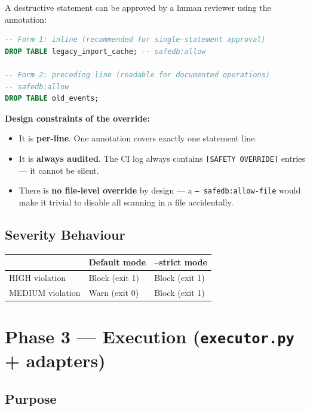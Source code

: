 \documentclass[12pt,a4paper]{report}
\begin{document}
A destructive statement can be approved by a human reviewer using the annotation:

\begin{lstlisting}[language=sql, caption={safedb:allow annotation — two valid forms}]
-- Form 1: inline (recommended for single-statement approval)
DROP TABLE legacy_import_cache; -- safedb:allow

-- Form 2: preceding line (readable for documented operations)
-- safedb:allow
DROP TABLE old_events;
\end{lstlisting}

\textbf{Design constraints of the override:}
\begin{itemize}
  \item It is \textbf{per-line}. One annotation covers exactly one statement line.
  \item It is \textbf{always audited}. The CI log always contains
        \texttt{[SAFETY OVERRIDE]} entries — it cannot be silent.
  \item There is \textbf{no file-level override} by design — a \texttt{-- safedb:allow-file}
        would make it trivial to disable all scanning in a file accidentally.
\end{itemize}

\subsection{Severity Behaviour}

\begin{center}
\begin{tabular}{@{}lll@{}}
\toprule
 & \textbf{Default mode} & \textbf{--strict mode} \\
\midrule
HIGH violation  & Block (exit 1) & Block (exit 1) \\
MEDIUM violation & Warn (exit 0) & Block (exit 1) \\
\bottomrule
\end{tabular}
\end{center}

\section{Phase 3 — Execution (\texttt{executor.py} + adapters)}

\subsection{Purpose}
\end{document}
